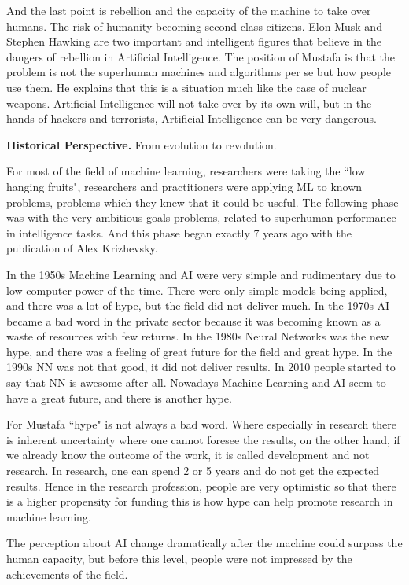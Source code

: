 \documentclass[9pt,a4paper]{article}
\begin{document}
And the last point is rebellion and the capacity of the machine to take over humans. The risk of humanity becoming second class citizens. 
Elon Musk and Stephen Hawking are two important and intelligent figures that believe in the dangers of rebellion in Artificial Intelligence. The position of Mustafa is that the problem is not the superhuman machines and algorithms per se but how people use them. He explains that this is a situation much like the case of nuclear weapons. Artificial Intelligence will not take over by its own will, but in the hands of hackers and terrorists, Artificial Intelligence can be very dangerous.

\textbf{Historical Perspective.} From evolution to revolution.

For most of the field of machine learning, researchers were taking the ``low hanging fruits", researchers and practitioners were applying ML to known problems, problems which they knew that it could be useful. The following phase was with the very ambitious goals problems, related to superhuman performance in intelligence tasks. And this phase began exactly 7 years ago with the publication of Alex Krizhevsky.

In the 1950s Machine Learning and AI were very simple and rudimentary due to low computer power of the time. There were only simple models being applied, and there was a lot of hype, but the field did not deliver much. 
In the 1970s AI became a bad word in the private sector because it was becoming known as a waste of resources with few returns.
In the 1980s Neural Networks was the new hype, and there was a feeling of great future for the field and great hype.
In the 1990s NN was not that good, it did not deliver results. In 2010 people started to say that NN is awesome after all. 
Nowadays Machine Learning and AI seem to have a great future, and there is another hype.

For Mustafa ``hype" is not always a bad word. Where especially in research there is inherent uncertainty where one cannot foresee the results, on the other hand, if we already know the outcome of the work, it is called development and not research. In research, one can spend 2 or 5 years and do not get the expected results. Hence in the research profession, people are very optimistic so that there is a higher propensity for funding this is how hype can help promote research in machine learning.

The perception about AI change dramatically after the machine could surpass the human capacity, but before this level, people were not impressed by the achievements of the field.
\end{document}

